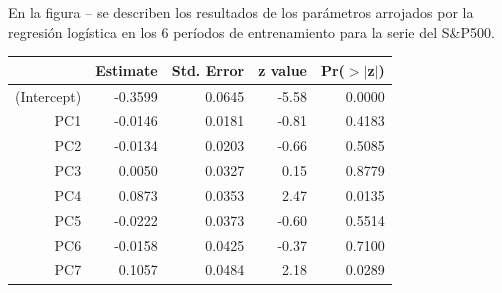 \documentclass[a4paper,12pt]{Latex/Classes/PhDthesisPSnPDF}
\begin{document}
En la figura -- se describen los resultados de los parámetros arrojados por la regresión logística en los 6 períodos de entrenamiento para la serie del S\&P500.
\begin{center}
\begin{table}[ht]
\centering
\begin{tabular}{rrrrr}
  \hline
 & Estimate & Std. Error & z value & Pr($>$$|$z$|$) \\ 
  \hline
(Intercept) & -0.3599 & 0.0645 & -5.58 & 0.0000 \\ 
  PC1 & -0.0146 & 0.0181 & -0.81 & 0.4183 \\ 
  PC2 & -0.0134 & 0.0203 & -0.66 & 0.5085 \\ 
  PC3 & 0.0050 & 0.0327 & 0.15 & 0.8779 \\ 
  PC4 & 0.0873 & 0.0353 & 2.47 & 0.0135 \\ 
  PC5 & -0.0222 & 0.0373 & -0.60 & 0.5514 \\ 
  PC6 & -0.0158 & 0.0425 & -0.37 & 0.7100 \\ 
  PC7 & 0.1057 & 0.0484 & 2.18 & 0.0289 \\ 
   \hline
\end{tabular}
\end{table}\end{center}
\end{document}
